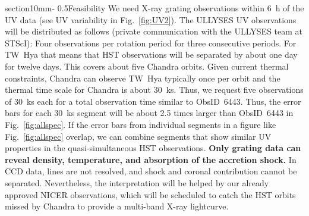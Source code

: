 \documentclass[letterpaper,11pt,twocolumn]{article}
\makeatletter
\renewcommand{\section}{\@startsection%
{section}{1}{0mm}{-\baselineskip}%
{0.5\baselineskip}{\normalfont\Large\bfseries}}%
\makeatother
\begin{document}
\section{Feasibility}
We need X-ray grating observations within 6~h of the UV data (see UV
variability in Fig.~\ref{fig:UV2}). The ULLYSES UV observations will be
distributed as follows (private communication with the ULLYSES team at
STScI): Four observations per rotation period for three consecutive
periods. For TW~Hya that means that HST observations will be separated by
about one day for twelve days. This covers about five Chandra
orbits. Given current thermal constraints, Chandra can observe TW~Hya
typically once per orbit and the thermal time scale for Chandra is
about 30~ks. Thus, we request five observations of 30~ks each for a
total observation time similar to ObsID~6443. Thus, the error bars for
each 30~ks segment will be about 2.5 times larger than ObsID~6443 in
Fig.~\ref{fig:allspec}. If
the error bars from individual segments in a figure like
Fig.~\ref{fig:allspec} overlap, we can combine segments that show
similar UV properties in the quasi-simultaneous HST observations.
\textbf{Only grating data can reveal density, temperature, and absorption of the accretion shock.} In CCD data, lines are not resolved, and shock and coronal contribution cannot be separated. Nevertheless, the interpretation will be helped by our already approved NICER observations, which will be scheduled to catch the HST orbits missed by Chandra to provide a multi-band X-ray lightcurve.
 







%
\end{document}
